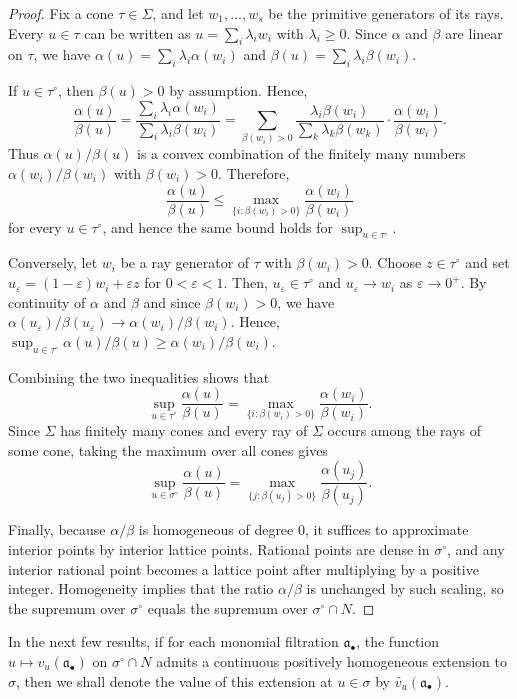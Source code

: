 \documentclass[12pt]{amsart}
\renewcommand{\a}{\mathfrak{a}}
\newcommand{\abul}{{\a_\bullet}}
\theoremstyle{plain}
\theoremstyle{definition}
\numberwithin{equation}{section}
\begin{document}
\begin{proof}
	Fix a cone $\tau\in\Sigma$, and let $w_1,\dots,w_s$ be the primitive generators of its rays. Every $u\in\tau$ can be written as $u=\sum_i\lambda_i w_i$ with $\lambda_i\ge0$. Since $\alpha$ and $\beta$ are linear on $\tau$, we have $\alpha(u)=\sum_i\lambda_i\alpha(w_i)$ and $\beta(u)=\sum_i\lambda_i\beta(w_i)$.
	
	If $u\in\tau^\circ$, then $\beta(u)>0$ by assumption. Hence,
	$$
	\frac{\alpha(u)}{\beta(u)}
	=
	\frac{\sum_i\lambda_i\alpha(w_i)}{\sum_i\lambda_i\beta(w_i)}
	=
	\sum_{\beta(w_i)>0}
	\frac{\lambda_i\beta(w_i)}{\sum_k\lambda_k\beta(w_k)}
	\cdot
	\frac{\alpha(w_i)}{\beta(w_i)}.
	$$
	Thus $\alpha(u)/\beta(u)$ is a convex combination of the finitely many numbers $\alpha(w_i)/\beta(w_i)$ with $\beta(w_i)>0$. Therefore,
	$$
	\frac{\alpha(u)}{\beta(u)}
	\le
	\max_{\{i:\beta(w_i)>0\}}\frac{\alpha(w_i)}{\beta(w_i)}
	$$
	for every $u\in\tau^\circ$, and hence the same bound holds for $\sup_{u\in\tau^\circ}$.
	
	Conversely, let $w_i$ be a ray generator of $\tau$ with $\beta(w_i)>0$. Choose $z\in\tau^\circ$ and set $u_\varepsilon=(1-\varepsilon)w_i+\varepsilon z$ for $0<\varepsilon<1$. Then, $u_\varepsilon\in\tau^\circ$ and $u_\varepsilon\to w_i$ as $\varepsilon\to0^+$. By continuity of $\alpha$ and $\beta$ and since $\beta(w_i)>0$, we have $\alpha(u_\varepsilon)/\beta(u_\varepsilon)\to\alpha(w_i)/\beta(w_i)$. Hence, $\sup_{u\in\tau^\circ}\alpha(u)/\beta(u)\ge\alpha(w_i)/\beta(w_i)$.
	
	Combining the two inequalities shows that
	$$
	\sup_{u\in\tau^\circ}\frac{\alpha(u)}{\beta(u)}
	=
	\max_{\{i:\beta(w_i)>0\}}\frac{\alpha(w_i)}{\beta(w_i)}.
	$$
	Since $\Sigma$ has finitely many cones and every ray of $\Sigma$ occurs among the rays of some cone, taking the maximum over all cones gives
	$$
	\sup_{u\in\sigma^\circ}\frac{\alpha(u)}{\beta(u)}
	=
	\max_{\{j:\beta(u_j)>0\}}\frac{\alpha(u_j)}{\beta(u_j)}.
	$$
	
	Finally, because $\alpha/\beta$ is homogeneous of degree $0$, it suffices to approximate interior points by interior lattice points. Rational points are dense in $\sigma^\circ$, and any interior rational point becomes a lattice point after multiplying by a positive integer. Homogeneity implies that the ratio $\alpha/\beta$ is unchanged by such scaling, so the supremum over $\sigma^\circ$ equals the supremum over $\sigma^\circ\cap N$.
\end{proof}

In the next few results, if for each monomial filtration $\abul$, the function $u \mapsto v_u(\abul)$ on $\sigma^\circ \cap N$ admits a continuous positively homogeneous extension to $\sigma$, then we shall denote the value of this extension at $u \in \sigma$ by  $\widetilde{v_u}(\abul)$.
\end{document}

